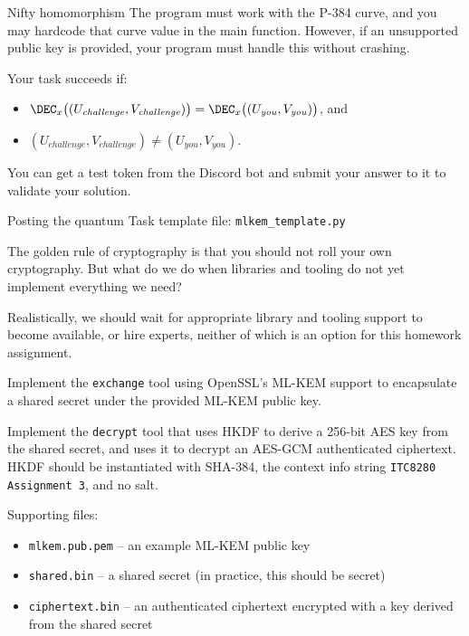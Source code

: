 \documentclass{homework}
\begin{document}
\begin{task}{Nifty homomorphism}
  The program must work with the P-384 curve, and you may hardcode that curve value in the main function.
  However, if an unsupported public key is provided, your program must handle this without crashing.
  
  Your task succeeds if:
  \begin{itemize}
    \item $\DEC_x\bigl((U_\mathit{challenge}, V_\mathit{challenge})\bigr) = \DEC_x\bigl((U_\mathit{you}, V_\mathit{you})\bigr)$, and
    \item $(U_\mathit{challenge}, V_\mathit{challenge}) \neq (U_\mathit{you}, V_\mathit{you})$.
  \end{itemize}

  You can get a test token from the Discord bot and submit your answer to it to validate your solution.
\end{task}

\begin{task}{Posting the quantum}
  Task template file: \texttt{mlkem\_template.py}

  The golden rule of cryptography is that you should not roll your own cryptography.
  But what do we do when libraries and tooling do not yet implement everything we need?

  Realistically, we should wait for appropriate library and tooling support to become available, or hire experts, neither of which is an option for this homework assignment.

  Implement the \texttt{exchange} tool using OpenSSL's ML-KEM support to encapsulate a shared secret under the provided ML-KEM public key.

  Implement the \texttt{decrypt} tool that uses HKDF to derive a 256-bit AES key from the shared secret, and uses it to decrypt an AES-GCM authenticated ciphertext.
  HKDF should be instantiated with SHA-384, the context info string \texttt{ITC8280 Assignment 3}, and no salt.

  Supporting files:
  \begin{itemize}
    \item \texttt{mlkem.pub.pem} -- an example ML-KEM public key
    \item \texttt{shared.bin} -- a shared secret (in practice, this should be secret)
    \item \texttt{ciphertext.bin} -- an authenticated ciphertext encrypted with a key derived from the shared secret
  \end{itemize}
\end{task}
\end{document}
